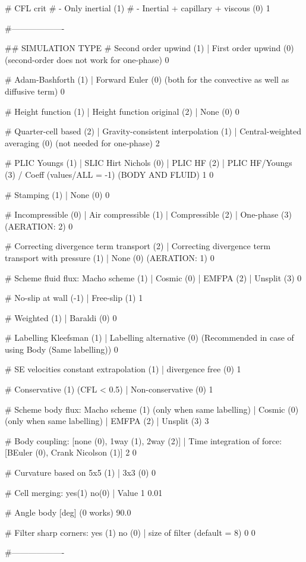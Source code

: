 # CFL crit
# - Only inertial (1)
# - Inertial + capillary + viscous (0)
1

#-------------------

## SIMULATION TYPE
# Second order upwind (1)	| First order upwind (0) (second-order does not work for one-phase)
0

# Adam-Bashforth (1)	| Forward Euler (0) (both for the convective as well as diffusive term)
0

# Height function (1)	| Height function original (2) | None (0)
0

# Quarter-cell based (2) | Gravity-consistent interpolation (1)	|	Central-weighted averaging (0) (not needed for one-phase)
2

# PLIC Youngs (1)	| SLIC Hirt Nichols (0) | PLIC HF (2) | PLIC HF/Youngs (3) / Coeff (values/ALL = -1) (BODY AND FLUID)
1 0

# Stamping (1)	| None (0)
0

# Incompressible (0)	| Air compressible (1)	| Compressible (2) | One-phase (3) (AERATION: 2)
0

# Correcting divergence term transport (2) | Correcting divergence term transport with pressure (1) | None (0) (AERATION: 1)
0

# Scheme fluid flux: Macho scheme (1)	|  Cosmic (0) | EMFPA (2) | Unsplit (3)
0

# No-slip at wall (-1)	| Free-slip (1)
1

# Weighted (1) | Baraldi (0)
0

# Labelling Kleefsman (1) | Labelling alternative (0) (Recommended in case of using Body (Same labelling))
0

# SE velocities constant extrapolation (1) | divergence free (0)
1

# Conservative (1) (CFL < 0.5) | Non-conservative (0)
1

# Scheme body flux: Macho scheme (1) (only when same labelling) | Cosmic (0) (only when same labelling) | EMFPA (2) | Unsplit (3)
3

# Body coupling: [none (0), 1way (1), 2way (2)] | Time integration of force: [BEuler (0), Crank Nicolson (1)]
2 0

# Curvature based on 5x5 (1) | 3x3 (0)
0

# Cell merging: yes(1) no(0) | Value
1 0.01
 
# Angle body [deg] (0 works)
90.0

# Filter sharp corners: yes (1) no (0) | size of filter (default = 8)
0 0

#-------------------

